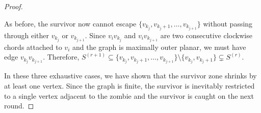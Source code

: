 \documentclass[letterpaper, 10pt]{article}
\begin{document}
\begin{proof}
\begin{enumerate}
\begin{enumerate}
      As before, the survivor now cannot escape $\{v_{k_j}, v_{k_j +1}, \dots, v_{k_{j+1}} \}$ without passing through
      either $v_{k_j}$ or $v_{k_{j+1}}$.
      Since $v_iv_{k_j}$ and $v_iv_{k_{j+1}}$ are two consecutive clockwise chords attached to $v_i$ and the
      graph is maximally outer planar, we must have edge $v_{k_j}v_{k_{j+1}}$.
      Therefore, $S^{(r+1)} \subseteq \{v_{k_j}, v_{k_j +1}, \dots, v_{k_{j+1}} \}
      \setminus \{ v_{k_j}, v_{k_j +1}\} \subsetneq S^{(r)}$.


    \end{enumerate}

\end{enumerate}

In these three exhaustive cases, we have shown that the survivor zone shrinks by at least one vertex.
Since the graph is finite, the survivor is inevitably restricted to a single vertex adjacent
to the zombie and the survivor is caught on the next round.

\end{proof}



\end{document}
